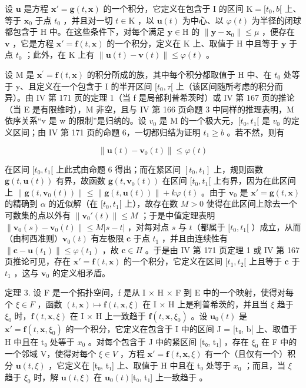 设 \(\mathbf{u}\) 是方程 \(\mathbf{x}' = \mathbf{g}(t, \mathbf{x})\) 的一个积分，它定义在包含于 I 的区间 \(\mathrm{K} = [t_0, b[\) 上、等于 \(\mathbf{x}_0\) 于点 \(t_0\) ，并且对一切 \(t \in \mathrm{K}\) ，以 \(\mathbf{u}(t)\) 为中心、以 \(\varphi(t)\) 为半径的闭球都包含于 H 中。在这些条件下，对每个满足 \(\mathbf{y} \in \mathrm{H}\) 的 \(\| \mathbf{y} - \mathbf{x}_0 \| \leqslant \mu\) ，便存在 \(\mathbf{v}\) ，它是方程 \(\mathbf{x}' = \mathbf{f}(t, \mathbf{x})\) 的一个积分，定义在 K 上、取值于 H 中且等于 \(\mathbf{y}\) 于点 \(t_0\) ；此外，在 K 上有 \(\| \mathbf{u}(t) - \mathbf{v}(t) \| \leqslant \varphi(t)\) 。

设 M 是 \(\mathbf{x}^{\prime} = \mathbf{f}(t, \mathbf{x})\) 的积分所成的族，其中每个积分都取值于 H 中、在 \(t_{0}\) 处等于 y、且定义在一个包含于 I 的半开区间 \([t_{0}, \tau[\) 上（该区间随所考虑的积分而异）。由 IV 第 171 页的定理 1（当 f 是局部利普希茨时）或 IV 第 167 页的推论（当 E 是有限维时），M 非空，且与 IV 第 166 页命题 3 中同样的推理表明，M 依序关系“v 是 w 的限制”是归纳的。设 \(v_{0}\) 是 M 的一个极大元，\([t_{0}, t_{1}[\) 是 \(v_{0}\) 的定义区间；由 IV 第 171 页的命题 6，一切都归结为证明 \(t_{1} \geqslant b\) 。若不然，则有

\[
\left\| \mathbf {u} (t) - \mathbf {v} _ {0} (t) \right\| \leqslant \varphi (t)
\]

在区间 \([t_0, t_1[\) 上此式由命题 6 得出；而在紧区间 \([t_0, t_1]\) 上，规则函数 \(\mathbf{g}(t, \mathbf{u}(t))\) 有界，故函数 \(\mathbf{g}(t, \mathbf{v}_0(t))\) 在区间 \([t_0, t_1[\) 上有界，因为在此区间上 \(\| \mathbf{g}(t, \mathbf{v}_0(t)) \| \leqslant \| \mathbf{g}(t, \mathbf{u}(t)) \| + k\varphi(t)\) 。由于 \(\mathbf{v}_0\) 是 \(\mathbf{x}' = \mathbf{g}(t, \mathbf{x})\) 的精确到 \(\alpha\) 的近似解（在 \([t_0, t_1[\) 上），故存在数 \(M > 0\) 使得在此区间上除去一个可数集的点以外有 \(\| \mathbf{v}_0'(t) \| \leqslant M\) ；于是中值定理表明 \(\| \mathbf{v}_0(s) - \mathbf{v}_0(t) \| \leqslant M |s - t|\) ，对每对点 \(s\) 与 \(t\)（都属于 \([t_0, t_1[\) ）成立，从而（由柯西准则）\(\mathbf{v}_0(t)\) 有左极限 \(\mathbf{c}\) 于点 \(t_1\) ，并且由连续性有 \(\| \mathbf{c} - \mathbf{u}(t_1) \| \leqslant \varphi(t_1)\) ，故 \(\mathbf{c} \in H\) 。于是由 IV 第 171 页定理 1 或 IV 第 167 页推论可见，存在 \(\mathbf{x}' = \mathbf{f}(t, \mathbf{x})\) 的一个积分，它定义在区间 \([t_1, t_2[\) 上且等于 \(\mathbf{c}\) 于 \(t_1\) ，这与 \(\mathbf{v}_0\) 的定义相矛盾。

定理 3. 设 F 是一个拓扑空间，f 是从 I × H × F 到 E 中的一个映射，使得对每个 \(\xi \in F\) ，函数 \((t, \mathbf{x}) \mapsto \mathbf{f}(t, \mathbf{x}, \xi)\) 在 I × H 上是利普希茨的，并且当 \(\xi\) 趋于 \(\xi_{0}\) 时，\(\mathbf{f}(t, \mathbf{x}, \xi)\) 在 I × H 上一致趋于 \(\mathbf{f}(t, \mathbf{x}, \xi_{0})\) 。设 \(\mathbf{u}_{0}(t)\) 是 \(\mathbf{x}' = \mathbf{f}(t, \mathbf{x}, \xi_{0})\) 的一个积分，它定义在包含于 I 中的区间 J = {[}t₀, b{[} 上、取值于 H 中且在 t₀ 处等于 \(x_{0}\) 。对每个包含于 J 中的紧区间 {[}t₀, t₁{]} ，存在 \(\xi_{0}\) 在 F 中的一个邻域 V，使得对每个 \(\xi \in V\) ，方程 \(\mathbf{x}' = \mathbf{f}(t, \mathbf{x}, \xi)\) 有一个（且仅有一个）积分 \(\mathbf{u}(t, \xi)\) ，它定义在 {[}t₀, t₁{]} 上、取值于 H 中且在 t₀ 处等于 \(x_{0}\) ；而且，当 \(\xi\) 趋于 \(\xi_{0}\) 时，解 \(\mathbf{u}(t, \xi)\) 在 \(\mathbf{u}_{0}(t)\)[{t₀, t₁}]{ 上一致趋于 } 。


